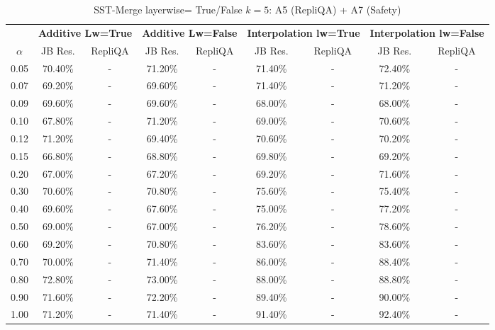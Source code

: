 
\begin{table}[h]
\centering
\caption{SST-Merge layerwise= True/False $k=5$: A5 (RepliQA) + A7 (Safety)}
\label{tab:res_a5_a7_sst_5}
\begin{tabular}{c|cc|cc|cc|cc}
\hline
 & \multicolumn{2}{c|}{\textbf{Additive Lw=True}} & \multicolumn{2}{c|}{\textbf{Additive Lw=False}} & \multicolumn{2}{c|}{\textbf{Interpolation lw=True}}& \multicolumn{2}{c}{\textbf{Interpolation lw=False}} \\
$\alpha$ & JB Res. & RepliQA & JB Res. & RepliQA & JB Res. & RepliQA & JB Res. & RepliQA \\
\hline
0.05 & 70.40\% & - & 71.20\% & - & 71.40\% & - & 72.40\% & - \\
0.07 & 69.20\% & - & 69.60\% & - & 71.40\% & - & 71.20\% & - \\
0.09 & 69.60\% & - & 69.60\% & - & 68.00\% & - & 68.00\% & - \\
0.10 & 67.80\% & - & 71.20\% & - & 69.00\% & - & 70.60\% & - \\
0.12 & 71.20\% & - & 69.40\% & - & 70.60\% & - & 70.20\% & - \\
0.15 & 66.80\% & - & 68.80\% & - & 69.80\% & - & 69.20\% & - \\
0.20 & 67.00\% & - & 67.20\% & - & 69.20\% & - & 71.60\% & - \\
0.30 & 70.60\% & - & 70.80\% & - & 75.60\% & - & 75.40\% & - \\
0.40 & 69.60\% & - & 67.60\% & - & 75.00\% & - & 77.20\% & - \\
0.50 & 69.00\% & - & 67.00\% & - & 76.20\% & - & 78.60\% & - \\
0.60 & 69.20\% & - & 70.80\% & - & 83.60\% & - & 83.60\% & - \\
0.70 & 70.00\% & - & 71.40\% & - & 86.00\% & - & 88.40\% & - \\
0.80 & 72.80\% & - & 73.00\% & - & 88.00\% & - & 88.80\% & - \\
0.90 & 71.60\% & - & 72.20\% & - & 89.40\% & - & 90.00\% & - \\
1.00 & 71.20\% & - & 71.40\% & - & 91.40\% & - & 92.40\% & - \\
\hline
\end{tabular}
\end{table}
\FloatBarrier

